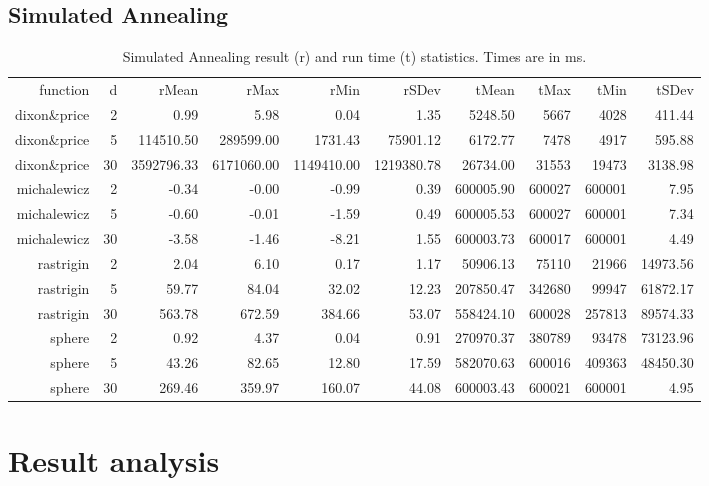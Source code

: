 \documentclass{article}
\begin{document}
    \subsection{Simulated Annealing}
    \begin{table}[ht]
        \centering
        {\footnotesize
           \begin{tabular}{rr|rrrrrrrr}
           function & d & rMean & rMax & rMin & rSDev & tMean & tMax & tMin & tSDev \\ 
           dixon\&price & 2 & 0.99 & 5.98 & 0.04 & 1.35 & 5248.50 & 5667 & 4028 & 411.44 \\  \hline
           dixon\&price & 5 & 114510.50 & 289599.00 & 1731.43 & 75901.12 & 6172.77 & 7478 & 4917 & 595.88 \\  \hline
           dixon\&price & 30 & 3592796.33 & 6171060.00 & 1149410.00 & 1219380.78 & 26734.00 & 31553 & 19473 & 3138.98 \\  \hline
           michalewicz & 2 & -0.34 & -0.00 & -0.99 & 0.39 & 600005.90 & 600027 & 600001 & 7.95 \\  \hline
           michalewicz & 5 & -0.60 & -0.01 & -1.59 & 0.49 & 600005.53 & 600027 & 600001 & 7.34 \\  \hline
           michalewicz & 30 & -3.58 & -1.46 & -8.21 & 1.55 & 600003.73 & 600017 & 600001 & 4.49 \\  \hline
           rastrigin & 2 & 2.04 & 6.10 & 0.17 & 1.17 & 50906.13 & 75110 & 21966 & 14973.56 \\  \hline
           rastrigin & 5 & 59.77 & 84.04 & 32.02 & 12.23 & 207850.47 & 342680 & 99947 & 61872.17 \\  \hline
           rastrigin & 30 & 563.78 & 672.59 & 384.66 & 53.07 & 558424.10 & 600028 & 257813 & 89574.33 \\  \hline
           sphere & 2 & 0.92 & 4.37 & 0.04 & 0.91 & 270970.37 & 380789 & 93478 & 73123.96 \\  \hline
           sphere & 5 & 43.26 & 82.65 & 12.80 & 17.59 & 582070.63 & 600016 & 409363 & 48450.30 \\  \hline
           sphere & 30 & 269.46 & 359.97 & 160.07 & 44.08 & 600003.43 & 600021 & 600001 & 4.95 \\  \hline
        \end{tabular}
        }
        \caption{Simulated Annealing result (r) and run time (t) statistics. Times are in ms.}
    \end{table}
        

    \section{Result analysis}
\end{document}
